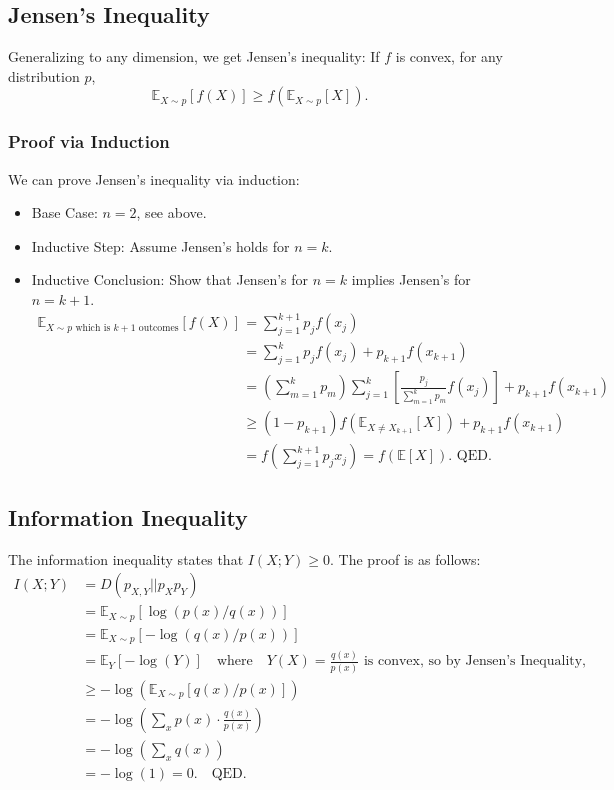 \subsection{Jensen's Inequality}
Generalizing to any dimension, we get Jensen's inequality:
If \( f \) is convex, for any distribution \( p \),
\begin{equation*}
\mathbb{E}_{X \sim p}[f(X)] \geq f(\mathbb{E}_{X \sim p}[X]).
\end{equation*}

\subsubsection{Proof via Induction}
\begin{Answer}
We can prove Jensen's inequality via induction:
\begin{itemize}
    \item Base Case: \( n=2 \), see above.
    \item Inductive Step: Assume Jensen's holds for \( n=k \).
    \item Inductive Conclusion: Show that Jensen's for \( n=k \) implies Jensen's for \( n=k+1 \).
    \begin{align*}
    \mathbb{E}_{X \sim p \text{ which is } k+1 \text{ outcomes}}[f(X)] &= \sum_{j=1}^{k+1} p_j f(x_j) \\
    &= \sum_{j=1}^{k} p_j f(x_j) + p_{k+1} f(x_{k+1}) \\
    &= \left(\sum_{m=1}^{k} p_m\right) \sum_{j=1}^{k} \left[\frac{p_j}{\sum_{m=1}^{k} p_m} f(x_j)\right] + p_{k+1} f(x_{k+1}) \\
    &\geq (1 - p_{k+1}) f\left(\mathbb{E}_{X \neq X_{k+1}}[X]\right) + p_{k+1} f(x_{k+1}) \\
    &= f\left(\sum_{j=1}^{k+1} p_j x_j\right) = f(\mathbb{E}[X]). \text{ QED.}
    \end{align*}
\end{itemize}
\end{Answer}

\subsection{Information Inequality}
The information inequality states that \( I(X; Y) \geq 0 \). The proof is as follows:
\begin{align*}
I(X; Y) &= D(p_{X, Y} || p_X p_Y) \\
&= \mathbb{E}_{X \sim p}[\log(p(x)/q(x))] \\
&= \mathbb{E}_{X \sim p}[-\log(q(x)/p(x))] \\
&= \mathbb{E}_{Y}[-\log(Y)] \quad \text{where} \quad Y(X)=\frac{q(x)}{p(x)} \text{ is convex, so by Jensen's Inequality,} \\
&\geq -\log(\mathbb{E}_{X \sim p}[q(x)/p(x)]) \\
&= -\log(\sum_x p(x) \cdot \frac{q(x)}{p(x)}) \\
&= -\log(\sum_x q(x)) \\
&= -\log(1) = 0. \quad \text{QED.}
\end{align*}
